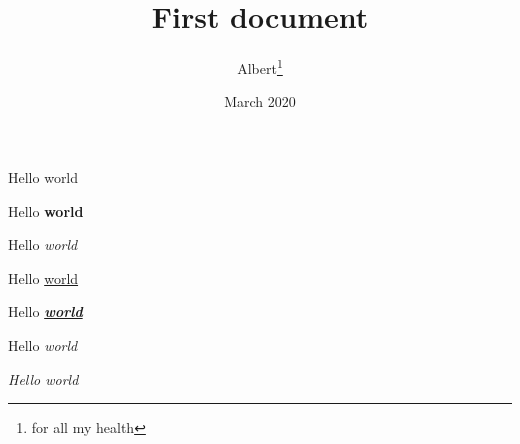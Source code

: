 \documentclass[12pt, a4paper]{article}
\title{First document}
\author{Albert\thanks{for all my health}}
\date{March 2020}
\begin{document}
\maketitle
Hello world

Hello \textbf{world}

Hello \textit{world}

Hello \underline{world}

Hello \underline{\textit{\textbf{world}}}

Hello \emph{world}

\textit{Hello \emph{world}}

\end{document}
